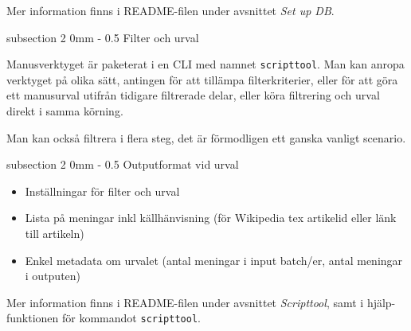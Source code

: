 \documentclass[11pt, a4paper, twoside]{article}
\makeatletter
\renewcommand{\subsection}{\@startsection
  {subsection}%
  {2}%
  {0mm}%
  {-\baselineskip}%
  {0.5\baselineskip}%
  {\bfseries\sffamily\large}}%
\makeatother
\begin{document}
Mer information finns i README-filen under avsnittet {\em Set up DB}.


\subsection{Filter och urval}

Manusverktyget är paketerat i en CLI med namnet {\tt scripttool}. Man kan anropa verktyget på olika sätt, antingen för att tillämpa filterkriterier, eller för att göra ett manusurval utifrån tidigare filtrerade delar, eller köra filtrering och urval direkt i samma körning.

Man kan också filtrera i flera steg, det är förmodligen ett ganska vanligt scenario.

\subsection{Outputformat vid urval}

\begin{itemize}
    \item Inställningar för filter och urval
    \item Lista på meningar inkl källhänvisning (för Wikipedia tex artikelid eller länk till artikeln)
    \item Enkel metadata om urvalet (antal meningar i input batch/er, antal meningar i outputen)
\end{itemize}

Mer information finns i README-filen under avsnittet {\em Scripttool}, samt i hjälp-funktionen för kommandot {\tt scripttool}.
\end{document}
